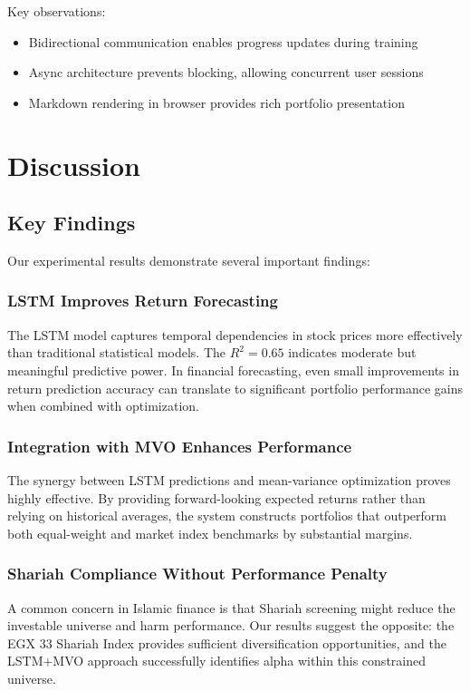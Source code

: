 \documentclass[conference]{IEEEtran}
\begin{document}
Key observations:
\begin{itemize}
\item Bidirectional communication enables progress updates during training
\item Async architecture prevents blocking, allowing concurrent user sessions
\item Markdown rendering in browser provides rich portfolio presentation
\end{itemize}

\section{Discussion}

\subsection{Key Findings}

Our experimental results demonstrate several important findings:

\subsubsection{LSTM Improves Return Forecasting}
The LSTM model captures temporal dependencies in stock prices more effectively than traditional statistical models. The $R^2 = 0.65$ indicates moderate but meaningful predictive power. In financial forecasting, even small improvements in return prediction accuracy can translate to significant portfolio performance gains when combined with optimization.

\subsubsection{Integration with MVO Enhances Performance}
The synergy between LSTM predictions and mean-variance optimization proves highly effective. By providing forward-looking expected returns rather than relying on historical averages, the system constructs portfolios that outperform both equal-weight and market index benchmarks by substantial margins.

\subsubsection{Shariah Compliance Without Performance Penalty}
A common concern in Islamic finance is that Shariah screening might reduce the investable universe and harm performance. Our results suggest the opposite: the EGX 33 Shariah Index provides sufficient diversification opportunities, and the LSTM+MVO approach successfully identifies alpha within this constrained universe.
\end{document}
